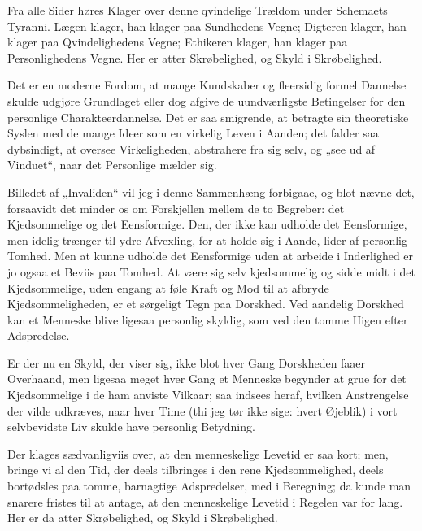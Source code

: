 \documentclass[12pt,a4paper]{book}
\newcommand{\apage}[1]{\marginnote{\footnotesize\textit{[#1]}}}
\begin{document}
Fra alle Sider høres Klager over denne qvindelige Trældom under Schemaets
Tyranni. Lægen klager, han klager paa Sundhedens Vegne; Digteren klager,
han klager paa Qvindelighedens Vegne; Ethikeren klager, han klager paa
Personlighedens Vegne. Her er atter Skrøbelighed, og Skyld i
Skrøbelighed.

Det er en moderne Fordom, at mange Kundskaber og fleersidig formel
Dannelse skulde udgjøre Grundlaget eller dog afgive de uundværligste
Betingelser for den personlige Charakteerdannelse. Det er saa
smigrende, at betragte sin theoretiske Syslen med de mange Ideer som en
virkelig Leven i Aanden; det falder saa dybsindigt, at oversee
Virkeligheden, abstrahere fra sig selv, og „see ud af Vinduet“, naar det
Personlige mælder sig.

Billedet af „Invaliden“ vil jeg i denne Sammenhæng forbigaae, og blot
nævne det, forsaavidt det minder os om Forskjellen mellem de to
Begreber: det Kjedsommelige og det Eensformige. Den, der ikke kan
udholde det Eensformige, men idelig trænger til ydre Afvexling, for at
holde sig i Aande, lider af personlig Tomhed. Men at kunne udholde det
Eensformige uden at arbeide i Inderlighed er jo ogsaa et Beviis paa
Tomhed. At være sig selv kjedsommelig og sidde midt i det Kjedsommelige,
uden engang at føle Kraft og Mod til at afbryde Kjedsommeligheden, er et
sørgeligt Tegn paa Dorskhed. Ved aandelig Dorskhed kan et Menneske blive
ligesaa personlig skyldig, som ved den tomme Higen efter Adspredelse.

Er der nu en Skyld, der viser sig, ikke blot hver Gang Dorskheden faaer
Overhaand, men ligesaa meget hver Gang \apage{102}
et Menneske begynder at grue for det Kjedsommelige i de ham anviste
Vilkaar; saa indsees heraf, hvilken Anstrengelse der vilde udkræves, naar
hver Time (thi jeg tør ikke sige: hvert Øjeblik) i vort selvbevidste Liv
skulde have personlig Betydning.

Der klages sædvanligviis over, at den menneskelige Levetid er saa kort;
men, bringe vi al den Tid, der deels tilbringes i den rene
Kjedsommelighed, deels bortødsles paa tomme, barnagtige Adspredelser, med
i Beregning; da kunde man snarere fristes til at antage, at den
menneskelige Levetid i Regelen var for lang. Her er da atter
Skrøbelighed, og Skyld i Skrøbelighed.
\end{document}
